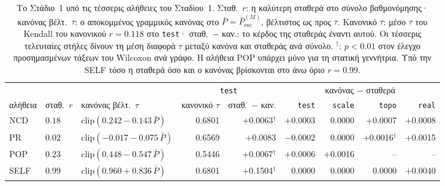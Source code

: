 \begin{table}[!htbp]
\centering
\footnotesize\setlength{\tabcolsep}{4pt}
\caption{Το Στάδιο~1 υπό τις τέσσερις αλήθειες του Σταδίου~1. Σταθ.\ $r$: η καλύτερη σταθερά στο σύνολο βαθμονόμησης· κανόνας βέλτ.\ $\tau$: ο αποκομμένος γραμμικός κανόνας στο $\bar P=\bar P^{(M)}_{\mathrm{esc}}$, βέλτιστος ως προς $\tau$. Κανονικό $\tau$: μέσο $\tau$ του Kendall του κανονικού $r=0.118$ στο \texttt{test}· σταθ.\ $-$ καν.: το κέρδος της σταθεράς έναντι αυτού. Οι τέσσερις τελευταίες στήλες δίνουν τη μέση διαφορά $\tau$ μεταξύ κανόνα και σταθεράς ανά σύνολο. $^{\dagger}$: $p<0.01$ στον έλεγχο προσημασμένων τάξεων του Wilcoxon ανά γράφο. Η αλήθεια POP υπάρχει μόνο για τη στατική γεννήτρια. Υπό την SELF τόσο η σταθερά όσο και ο κανόνας βρίσκονται στο άνω όριο $r=0.99$.}
\label{tab:stage1truth}
\begin{tabular}{@{}lllrrrrrr@{}}
\toprule
& & & \multicolumn{2}{c}{\texttt{test}} & \multicolumn{4}{c}{κανόνας $-$ σταθερά} \\
\cmidrule(lr){4-5}\cmidrule(l){6-9}
αλήθεια & σταθ.\ $r$ & κανόνας βέλτ.\ $\tau$ & κανονικό $\tau$ & σταθ.\ $-$ καν. & \texttt{test} & \texttt{scale} & \texttt{topo} & \texttt{real} \\
\midrule
NCD & $0.18$ & $\mathrm{clip}(0.242-0.143\,\bar P)$ & 0.6801 & $+$0.0063$^{\dagger}$ & $+$0.0003 & 0.0000 & $+$0.0007 & $+$0.0008 \\
PR & $0.02$ & $\mathrm{clip}(-0.017-0.075\,\bar P)$ & 0.6569 & $+$0.0083 & $-$0.0002 & 0.0000 & $+$0.0016$^{\dagger}$ & $+$0.0015 \\
POP & $0.23$ & $\mathrm{clip}(0.448-0.547\,\bar P)$ & 0.5446 & $+$0.0067$^{\dagger}$ & $+$0.0006 & $+$0.0016 & -- & -- \\
SELF & $0.99$ & $\mathrm{clip}(0.960+0.836\,\bar P)$ & 0.6801 & $+$0.1504$^{\dagger}$ & 0.0000 & 0.0000 & 0.0000 & $+$0.0040 \\
\bottomrule
\end{tabular}
\end{table}
